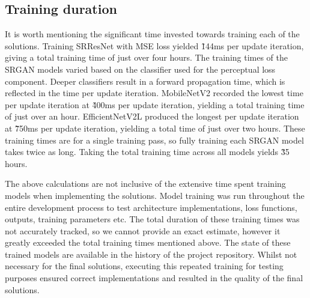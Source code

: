 \subsection{Training duration}
It is worth mentioning the significant time invested towards training each of the solutions. Training SRResNet with MSE loss yielded \~144ms per update iteration, giving a total training time of just over four hours. The training times of the SRGAN models varied based on the classifier used for the perceptual loss component. Deeper classifiers result in a forward propagation time, which is reflected in the time per update iteration. MobileNetV2 recorded the lowest time per update iteration at \~400ms per update iteration, yielding a total training time of just over an hour. EfficientNetV2L produced the longest per update iteration at \~750ms per update iteration, yielding a total time of just over two hours. These training times are for a single training pass, so fully training each SRGAN model takes twice as long. Taking the total training time across all models yields \~35 hours.

The above calculations are not inclusive of the extensive time spent training models when implementing the solutions. Model training was run throughout the entire development process to test architecture implementations, loss functions, outputs, training parameters etc. The total duration of these training times was not accurately tracked, so we cannot provide an exact estimate, however it greatly exceeded the total training times mentioned above. The state of these trained models are available in the history of the project repository. Whilst not necessary for the final solutions, executing this repeated training for testing purposes ensured correct implementations and resulted in the quality of the final solutions.

